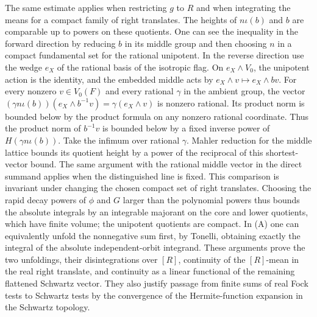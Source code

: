 The same estimate applies when restricting \(g\) to \(R\)
and when integrating the means for a compact family of right
translates. The heights of \(n\iota(b)\) and \(b\) are
comparable up to powers on these quotients. One can see the
inequality in the forward direction by reducing \(b\) in its
middle group and then choosing \(n\) in a compact fundamental
set for the rational unipotent. In the reverse direction use
the wedge \(e_X\) of the rational basis of the isotropic
flag. On \(e_X\wedge V_0\), the unipotent action is the
identity, and the embedded middle acts by
\(e_X\wedge v\mapsto e_X\wedge b v\). For every nonzero
\(v\in V_0(F)\) and every rational \(\gamma\) in the
ambient group, the vector
\((\gamma n\iota(b))(e_X\wedge b^{-1}v)
=\gamma(e_X\wedge v)\) is nonzero rational. Its product
norm is bounded below by the product formula on any nonzero
rational coordinate. Thus the product norm of \(b^{-1}v\) is
bounded below by a fixed inverse power of
\(H(\gamma n\iota(b))\). Take the infimum over rational
\(\gamma\). Mahler reduction for the middle lattice bounds
its quotient height by a power of the reciprocal of this
shortest-vector bound. The same argument with the rational
middle vector in the direct summand applies when the
distinguished line is fixed. This comparison is invariant under
changing the chosen compact set of right translates. Choosing
the rapid decay powers of \(\phi\) and \(G\) larger than
the polynomial powers thus bounds the absolute integrals by an
integrable majorant on the core and lower quotients, which have
finite volume; the unipotent quotients are compact. In (A)
one can equivalently unfold the nonnegative sum first, by
Tonelli, obtaining exactly the integral of the absolute
independent-orbit integrand. These arguments prove the two
unfoldings, their disintegrations over \([R]\), continuity
of the \([R]\)-mean in the real right translate, and
continuity as a linear functional of the remaining flattened
Schwartz vector. They also justify passage from finite sums of
real Fock tests to Schwartz tests by the convergence of the
Hermite-function expansion in the Schwartz topology.

